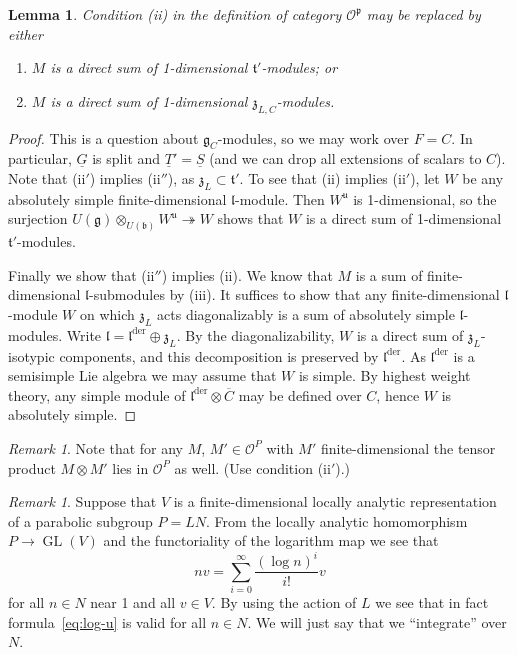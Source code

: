\documentclass[a4paper]{amsart}
\numberwithin{equation}{section}
\newtheorem{lem}[thm]{Lemma}
\theoremstyle{remark}
\newtheorem{remark}[thm]{Remark}
\theoremstyle{definition}
\DeclareMathOperator{\GL}{GL}
\newcommand{\alggrp}[1]{\underline{#1}}
\newcommand{\der}{\mathrm{der}}
\newcommand{\onto}{\twoheadrightarrow}
\begin{document}
\begin{lem}\label{lm:cat-O-p-equivalence}
  Condition (ii) in the definition of category $\mathcal{O}^{\mathfrak p}$ may be replaced by either
  \begin{enumerate}
  \item[\upshape{(ii$'$)}] $M$ is a direct sum of 1-dimensional $\mathfrak{t}'$-modules; or
  \item[\upshape{(ii$''$)}] $M$ is a direct sum of 1-dimensional $\mathfrak{z}_{L,C}$-modules.
  \end{enumerate}
\end{lem}

\begin{proof}
  This is a question about $\mathfrak g_C$-modules, so we may work over $F = C$.
  In particular, $\alggrp G$ is split and $\alggrp{T}' = \alggrp{S}$ (and we can drop all
  extensions of scalars to $C$).
  Note that (ii$'$) implies (ii$''$), as $\mathfrak{z}_{L} \subset \mathfrak{t}'$.
  To see that (ii) implies (ii$'$), let $W$ be any absolutely simple finite-dimensional $\mathfrak{l}$-module.
  Then $W^{\mathfrak{u}}$ is 1-dimensional, so the surjection
  $U(\mathfrak{g}) \otimes_{U(\mathfrak{b})} W^{\mathfrak{u}} \onto W$ shows that $W$ is a direct sum of 1-dimensional $\mathfrak{t}'$-modules.

  Finally we show that (ii$''$) implies (ii).
  We know that $M$ is a sum of finite-dimensional $\mathfrak{l}$-submodules by (iii). 
  It suffices to show that any finite-dimensional $\mathfrak{l}$-module $W$ on which $\mathfrak{z}_{L}$ acts diagonalizably is a sum of absolutely simple $\mathfrak{l}$-modules.
  Write $\mathfrak{l} = \mathfrak{l}^{\der} \oplus \mathfrak{z}_{L}$.
  By the diagonalizability, $W$ is a direct sum of $\mathfrak{z}_{L}$-isotypic components, and this decomposition is preserved by $\mathfrak{l}^{\der}$.
  As $\mathfrak{l}^{\der}$ is a semisimple Lie algebra we may assume that $W$ is simple.
  By highest weight theory, any simple module of $\mathfrak{l}^{\der} \otimes \overline C$ may be defined over $C$, hence $W$ is absolutely simple.
\end{proof}

\begin{remark}\label{rk:tensor-O-P}
  Note that for any $M$, $M' \in \mathcal{O}^{P}$ with $M'$ finite-dimensional the tensor product $M \otimes M'$ lies in $\mathcal{O}^{P}$ as well. (Use condition (ii$'$).)
\end{remark}

\begin{remark}
  Suppose that $V$ is a finite-dimensional locally analytic representation of a parabolic subgroup $P = LN$.
  From the locally analytic homomorphism $P \to \GL(V)$ and the functoriality of the logarithm map \cite[III.7.6]{MR0573068} we see that
  \begin{equation}
    \label{eq:log-u}
    nv = \sum_{i=0}^\infty \frac{(\log n)^i}{i!} v
  \end{equation}
  for all $n \in N$ near 1 and all $v \in V$.
  By using the action of $L$ we see that in fact formula~\eqref{eq:log-u} is valid for all $n \in N$.
  We will just say that we ``integrate'' over $N$.
\end{remark}
\end{document}
